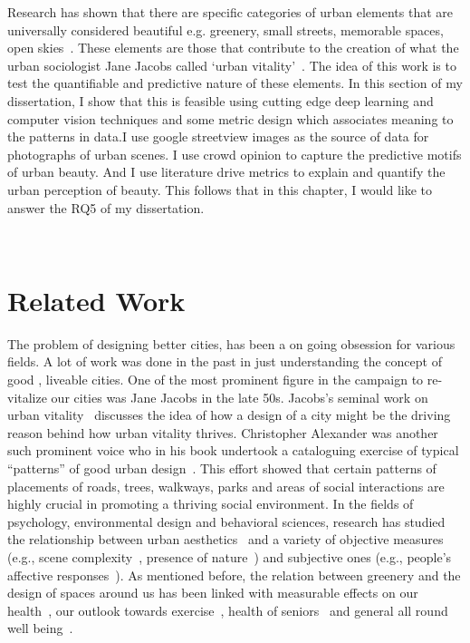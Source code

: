 Research has shown that there are specific categories of urban elements that are universally considered beautiful e.g. greenery, small streets, memorable spaces, open skies~\cite{alexander1977pattern, quercia2014aesthetic,salesses2013collaborative}. These elements are those that contribute to the creation of what the urban sociologist Jane Jacobs called `urban vitality'~\cite{jacobs1961death}. 
The idea of this work is to test the quantifiable and predictive nature of these elements. In this section of my dissertation, I show that this is feasible using cutting edge deep learning and computer vision techniques and some metric design which associates meaning to the patterns in data.I use google streetview images as the source of data for photographs of urban scenes. I use crowd opinion to capture the predictive motifs of urban beauty. And I use literature drive metrics to explain and quantify the urban perception of beauty. This follows that in this chapter, I would like to answer the RQ5 of my dissertation.
 
\noindent{}
\\


\section{Related Work}
\label{sec:related}
The problem of designing better cities, has been a on going obsession for various fields. A lot of work was done in the past in just understanding the concept of good , liveable cities. One of the most prominent figure in the campaign to re-vitalize our cities was Jane Jacobs in the late 50s.  Jacobs's seminal work on urban vitality~\cite{jacobs1961death} discusses the idea of how a design of a city might be the driving reason behind how urban vitality thrives. Christopher Alexander was another such prominent voice who in his book undertook a cataloguing exercise  of typical ``patterns'' of good urban design~\cite{alexander1977pattern}. This effort showed that certain patterns of placements of roads, trees, walkways, parks and areas of social interactions are highly crucial in promoting a thriving social environment. In the fields of psychology, environmental design and behavioral sciences, research has studied the relationship between urban aesthetics~\cite{real2000classification} and a variety of objective measures  (e.g.,  scene complexity~\cite{kaplan1972rated}, presence of nature~\cite{kaplan1989experience}) and subjective ones (e.g., people's affective responses~\cite{ulrich1983aesthetic}). As mentioned before, the relation between greenery and the design of spaces around us has been linked with  measurable effects on our health~\cite{maas2006green,lee2011health}, our outlook towards exercise~\cite{tamosiunas2014accessibility}, health of seniors~\cite{takano2002urban} and general all round well being~\cite{gascon2015mental,nutsford2013ecological}.

